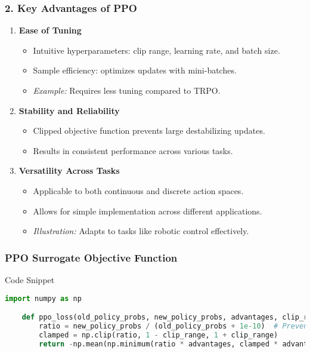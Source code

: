 \documentclass{beamer}
\begin{document}
\begin{frame}
    \frametitle{2. Key Advantages of PPO}
    \begin{enumerate}
        \item \textbf{Ease of Tuning}
        \begin{itemize}
            \item Intuitive hyperparameters: clip range, learning rate, and batch size.
            \item Sample efficiency: optimizes updates with mini-batches.
            \item \textit{Example:} Requires less tuning compared to TRPO.
        \end{itemize}

        \item \textbf{Stability and Reliability}
        \begin{itemize}
            \item Clipped objective function prevents large destabilizing updates.
            \item Results in consistent performance across various tasks.
        \end{itemize}

        \item \textbf{Versatility Across Tasks}
        \begin{itemize}
            \item Applicable to both continuous and discrete action spaces.
            \item Allows for simple implementation across different applications.
            \item \textit{Illustration:} Adapts to tasks like robotic control effectively.
        \end{itemize}
    \end{enumerate}
\end{frame}

\begin{frame}[fragile]
    \frametitle{PPO Surrogate Objective Function}
    \begin{block}{Code Snippet}
    \begin{lstlisting}[language=Python]
    import numpy as np

    def ppo_loss(old_policy_probs, new_policy_probs, advantages, clip_range):
        ratio = new_policy_probs / (old_policy_probs + 1e-10)  # Prevent division by zero
        clamped = np.clip(ratio, 1 - clip_range, 1 + clip_range)
        return -np.mean(np.minimum(ratio * advantages, clamped * advantages))
    \end{lstlisting}
    \end{block}
\end{frame}
\end{document}
